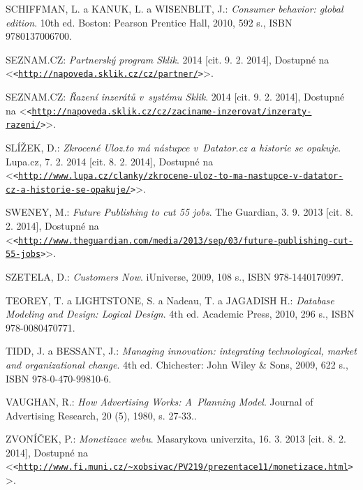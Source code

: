 \documentclass[12pt,twoside,openany]{fithesis}
\let\origurl\url
\def\url#1{\texttt{<\origurl{#1}>}}
\begin{document}
\begin{thebibliography}{99}
SCHIFFMAN, L. a KANUK, L. a WISENBLIT, J.: \emph{Consumer behavior: global edition}. 10th ed. Boston: Pearson Prentice Hall, 2010, 592 s., ISBN 9780137006700. 

SEZNAM.CZ: \emph{Partnerský program Sklik}. 2014 [cit. 9. 2. 2014], Dostupné na {\textless}\url{http://napoveda.sklik.cz/cz/partner/}{\textgreater}.

SEZNAM.CZ: \emph{Řazení inzerátů v~systému Sklik}. 2014 [cit. 9. 2. 2014], Dostupné na {\textless}\url{http://napoveda.sklik.cz/cz/zaciname-inzerovat/inzeraty-razeni/}{\textgreater}.

SLÍŽEK, D.: \emph{Zkrocené Uloz.to má nástupce v~Datator.cz a historie se opakuje}. Lupa.cz, 7. 2. 2014 [cit. 8. 2. 2014], Dostupné na {\textless}\url{http://www.lupa.cz/clanky/zkrocene-uloz-to-ma-nastupce-v-datator-cz-a-historie-se-opakuje/}{\textgreater}.

SWENEY, M.: \emph{Future Publishing to cut 55 jobs}. The Guardian, 3. 9. 2013 [cit. 8. 2. 2014], Dostupné na {\textless}\url{http://www.theguardian.com/media/2013/sep/03/future-publishing-cut-55-jobs}{\textgreater}.

SZETELA, D.: \emph{Customers Now}. iUniverse, 2009, 108 s., ISBN 978-1440170997. 

TEOREY, T. a LIGHTSTONE, S. a Nadeau, T. a JAGADISH H.: 
\emph{Database Modeling and Design: Logical Design}. 4th ed. Academic Press, 2010, 296 s., ISBN 978-0080470771.

TIDD, J. a BESSANT, J.: \emph{Managing innovation: integrating technological, market and
      organizational change}. 4th ed. Chichester: John Wiley \& Sons, 2009, 622 s., ISBN 978-0-470-99810-6.

VAUGHAN, R.: \emph{How Advertising Works: A~Planning Model}. Journal of Advertising Research, 20 (5), 1980, s. 27-33..

ZVONÍČEK, P.: \emph{Monetizace webu}. Masarykova univerzita, 16. 3. 2013 [cit. 8. 2. 2014], Dostupné na {\textless}\url{http://www.fi.muni.cz/~xobsivac/PV219/prezentace11/monetizace.html}{\textgreater}.

\end{thebibliography}


\newpage

\end{document}
